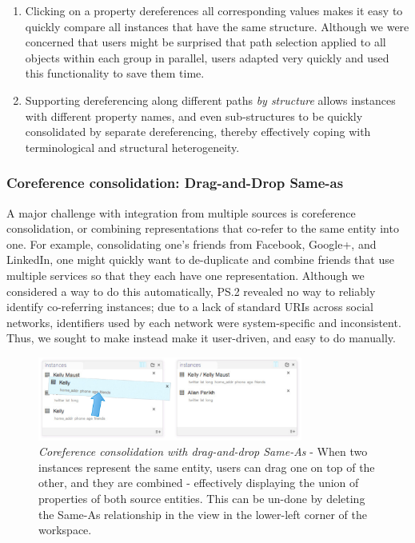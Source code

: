 \documentclass{sigchi}
\begin{document}
\begin{enumerate}
\item Clicking on a property dereferences all corresponding values makes it easy to quickly compare all instances that have the same structure.  Although we were concerned that users might be surprised that path selection applied to all objects within each group in parallel, users adapted very quickly and used this functionality to save them time.   

\item Supporting dereferencing along different paths \emph{by structure} allows instances with different property names, and even sub-structures to be quickly consolidated by separate dereferencing, thereby effectively coping with terminological and structural heterogeneity.
\end{enumerate}

\subsubsection{Coreference consolidation: Drag-and-Drop Same-as}



A major challenge with integration from multiple sources is coreference consolidation, or combining representations that co-refer to the same entity into one.  For example, consolidating one's friends from Facebook, Google+, and LinkedIn, one might quickly want to de-duplicate and combine friends that use multiple services so that they each have one representation.  Although we considered a way to do this automatically, PS.2 revealed no way to reliably identify co-referring instances; due to a lack of standard URIs across social networks, identifiers used by each network were system-specific and inconsistent. Thus, we sought to make instead make it user-driven, and easy to do manually.  

\begin{figure}[htbp]
\begin{center}
\includegraphics[width=8.7cm]{img/sameas}
\caption{\emph{Coreference consolidation with drag-and-drop Same-As} - When two instances represent the same entity, users can drag one on top of the other, and they are combined - effectively displaying the union of properties of both source entities. This can be un-done by deleting the Same-As relationship in the view in the lower-left corner of the workspace.}
\label{fig:sameas}
\end{center}
\end{figure}
\end{document}
